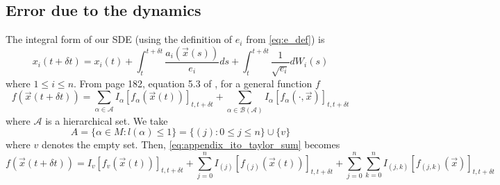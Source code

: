 \documentclass[12pt]{article}
\begin{document}
\subsection{Error due to the dynamics}

The integral form of our SDE (using the definition of $e_i$ from \eqref{eq:e_def}) is
\begin{equation}
x_{i}(t + \delta t) = x_{i}(t) + \int_{t}^{t + \delta t} \frac{a_i(\vec{x}(s))}{e_i} ds + \int_{t}^{t+\delta t} \frac{1}{\sqrt{e_i}} dW_i(s)
\end{equation}
where $1 \le i \le n$. 
%
From page 182, equation 5.3 of \cite{kloeden1992numerical}, for a general function $f$
%
\begin{equation} \label{eq:appendix_ito_taylor_sum}
f(\vec{x}(t+\delta t)) = \sum_{\alpha \in \mathcal{A}} I_\alpha[f_\alpha (\vec{x}(t))]_{t, t+\delta t} + \sum_{\alpha \in \mathcal{B}(\mathcal{A})} I_\alpha [f_\alpha(\cdot, \vec{x})]_{t, t+\delta t}
\end{equation}
where $\mathcal{A}$ is a hierarchical set. 
%
We take 
\begin{equation}
 A = \{ \alpha \in M : l(\alpha) \le 1 \} = \{ (j) : 0 \le j \le n \} \cup \{v \}
\end{equation}
%
where $v$ denotes the empty set.
%
Then, \eqref{eq:appendix_ito_taylor_sum} becomes
\begin{equation} \label{eq:general_ito_taylor_sum}
f(\vec{x}(t+\delta t)) = I_{v} [f_v(\vec{x}(t))]_{t, t+\delta t} + \sum_{j=0}^n I_{(j)} [f_{(j)}(\vec{x}(t))]_{t, t+\delta t} + \sum_{j=0}^n \sum_{k=0}^n I_{(j,k)} [f_{(j,k)} ( \vec{x} )]_{t, t+\delta t}
\end{equation}
\end{document}
